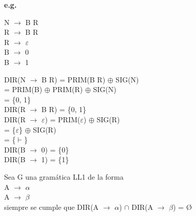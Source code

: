 \documentclass[\main/ApuntesPL.tex]{subfiles}
\begin{document}
    \par
    \textbf{e.g.}
    \begin{center}
      \begin{minipage}{.3\textwidth}
        \hspace*{5mm}N $\rightarrow$ B R\\
        \hspace*{5mm}R $\rightarrow$ B R\\
        \hspace*{5mm}R $\rightarrow$ $\varepsilon$\\
        \hspace*{5mm}B $\rightarrow$ 0\\
        \hspace*{5mm}B $\rightarrow$ 1
      \end{minipage}%
      \begin{minipage}{.65\textwidth}
        \hspace*{5mm}DIR(N $\rightarrow$ B R) = PRIM(B R) $\oplus$ SIG(N)\\
        \hspace*{33mm}= PRIM(B) $\oplus$ PRIM(R) $\oplus$ SIG(N)\\
        \hspace*{33mm}= \{0, 1\}\\
        \hspace*{5mm}DIR(R $\rightarrow$ B R) = \{0, 1\}\\
        \hspace*{5mm}DIR(R $\rightarrow$ $\varepsilon$) = PRIM($\varepsilon$) $\oplus$ SIG(R)\\
        \hspace*{28mm}= \{$\varepsilon$\} $\oplus$ SIG(R)\\
        \hspace*{28mm}= \{$\vdash$\}\\
        \hspace*{5mm}DIR(B $\rightarrow$ 0) = \{0\}\\
        \hspace*{5mm}DIR(B $\rightarrow$ 1) = \{1\}
      \end{minipage}
    \end{center}

    \bigskip
    \par
    Sea G una gramática LL1 de la forma\\
    \hspace{5mm}A $\rightarrow$ $\alpha$\\
    \hspace{5mm}A $\rightarrow$ $\beta$\\
    siempre se cumple que DIR(A $\rightarrow$ $\alpha$) $\cap$ DIR(A $\rightarrow$ $\beta$) = \O
\end{document}
